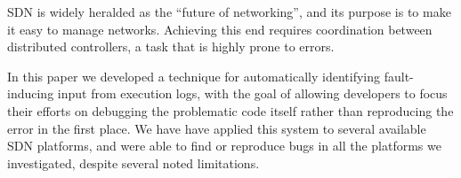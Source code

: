SDN is widely heralded as the ``future of networking'', and its purpose is to make
it easy to manage networks. Achieving this end requires coordination
between distributed controllers, a task that is highly prone to errors.

In this paper we developed a technique for automatically
identifying fault-inducing input from execution logs, with the
goal of allowing developers to focus their efforts on debugging the problematic
code itself rather than reproducing the error in the first place.
We have have applied this system to several available SDN platforms, and
were able to find or reproduce bugs in all the platforms we investigated,
despite several noted limitations.


